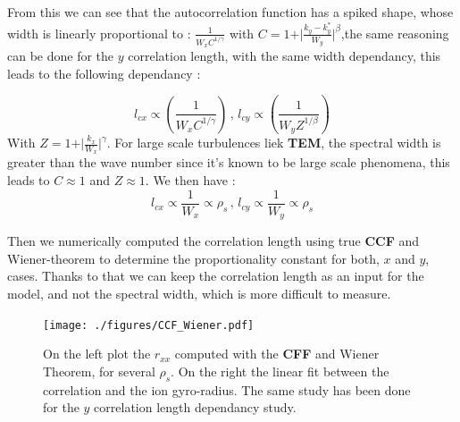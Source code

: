 \documentclass[11pt,a4paper,openany]{report}
\begin{document}
\begin{multicols}{2}
    From this we can see that the autocorrelation function has a spiked shape, whose width is linearly proportional to :
    $\frac{1}{W_x C^{1/ \gamma}}$ with $C = 1 + \vert \frac{k_y - k_y^*}{W_y}\vert^\beta$,the same reasoning can be done for the $y$ correlation length, with the same width dependancy, this leads to the following dependancy :

    $$l_{cx} \propto \left(\frac{1}{W_x C^{1/ \gamma}}\right) \, ,\, l_{cy} \propto \left(\frac{1}{W_y Z^{1/ \beta}}\right) $$
    With $Z = 1 + \vert \frac{k_x}{W_x} \vert^\gamma$. For large scale turbulences liek \textbf{TEM}, the spectral width is greater than the wave number since it's known to be large scale phenomena, this leads to $C \approx 1$ and $Z \approx 1$. We then have :
    $$l_{cx} \propto \frac{1}{W_x}  \propto \rho_s \, ,\, l_{cy} \propto \frac{1}{W_y} \propto \rho_s$$

    Then we numerically computed the correlation length using true \textbf{CCF} and Wiener-theorem to determine the proportionality constant for both, $x$ and $y$, cases. Thanks to that we can keep the correlation length as an input for the model, and not the spectral width, which is more difficult to measure.
\end{multicols}
\begin{figure}[H]
    \centering
    \texttt{[image: ./figures/CCF\_Wiener.pdf]}
    \caption{On the left plot the $r_{x x}$ computed with the \textbf{CFF} and Wiener Theorem, for several $\rho_s$. On the right the linear fit between the correlation and the ion gyro-radius. The same study has been done for the $y$ correlation length dependancy study.}
    \label{Wiener}
\end{figure}
\end{document}
